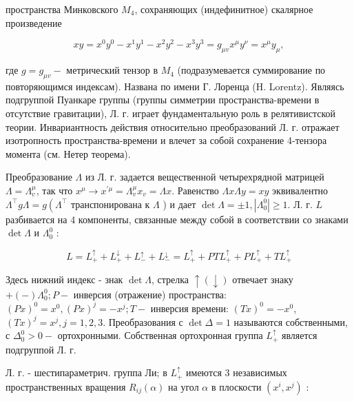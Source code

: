 \documentclass[10pt]{article}
\begin{document}
пространства Минковского $M_{4}$, сохраняющих (индефинитное) скалярное произведение



\[

x y=x^{0} y^{0}-x^{1} y^{1}-x^{2} y^{2}-x^{3} y^{3}=g_{\mu v} x^{\mu} y^{\nu}=x^{\mu} y_{\mu},

\]



где $g=g_{\mu v}-$ метрический тензор в $M_{4}$ (подразумевается суммирование по повторяющимся индексам). Названа по имени Г. Лоренца (H. Lorentz). Являясь подгруппой Пуанкаре группы (группы симметрии пространства-времени в отсутствие гравитации), Л. г. играет фундаментальную роль в релятивистской теории. Инвариантность действия относительно преобразований Л. г. отражает изотропность пространства-времени и влечет за собой сохранение 4-тензора момента (см. Нетер теорема).



Преобразование $\Lambda$ из Л. г. задается вещественной четырехрядной матрицей $\Lambda=\Lambda_{v}^{\mu}$, так что $x^{\mu} \rightarrow x^{\prime \mu}=\Lambda_{v}^{\mu} x_{v}=\Lambda x$. Равенство $\Lambda x \Lambda y=x y$ эквивалентно $\Lambda^{\top} g \Lambda=g\left(\Lambda^{\top}\right.$ транспонирована к $\Lambda$ ) и дает $\operatorname{det} \Lambda= \pm 1,\left|\Lambda_{0}^{0}\right| \geqslant 1$. Л. г. $L$ разбивается на 4 компоненты, связанные между собой в соответствии со знаками $\operatorname{det} \Lambda$ и $\Lambda_{0}^{0}$ :



\[

L=L_{+}^{\uparrow}+L_{+}^{\downarrow}+L_{-}^{\uparrow}+L_{-}^{\downarrow}=L_{+}^{\uparrow}+P T L_{+}^{\uparrow}+P L_{+}^{\uparrow}+T L_{+}^{\uparrow}

\]



Здесь нижний индекс - знак $\operatorname{det} \Lambda$, стрелка $\uparrow(\downarrow)$ отвечает знаку $+(-) \Lambda_{0}^{0} ; P-$ инверсия (отражение) пространства: $(P x)^{0}=x^{0},(P x)^{j}=-x^{j} ; T-$ инверсия времени: $(T x)^{0}=-x^{0}$, $(T x)^{j}=x^{j}, j=1,2,3$. Преобразования с $\operatorname{det} \Delta=1$ называются собственными, с $\Delta_{0}^{0}>0-$ ортохронными. Собственная ортохронная группа $L_{+}^{\uparrow}$ является подгруппой Л. г.



Л. г. - шестипараметрич. группа Ли; в $L_{+}^{\uparrow}$ имеются 3 независимых пространственных вращения $R_{i j}(\alpha)$ на угол $\alpha$ в плоскости $\left(x^{i}, x^{j}\right)$ :
\end{document}
